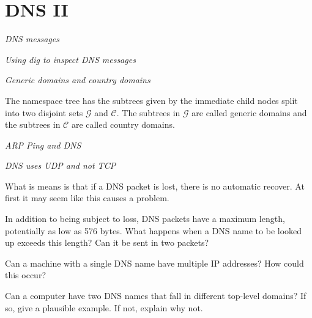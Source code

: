 %
%
%
%
%
%
%
%
%



\section{DNS II}


\frmrule 

\textit{DNS messages}


\frmrule 

\textit{Using dig to inspect DNS messages}


\frmrule 

\textit{Generic domains and country domains}

The namespace tree has the subtrees
given by the immediate child nodes 
split into two disjoint sets $\mathcal{G}$ and $\mathcal{C}$. 
The subtrees in $\mathcal{G}$ are called generic domains 
and the subtrees in $\mathcal{C}$ are called country domains. 


\frmrule 

\textit{ARP Ping and DNS}


\frmrule 

\textit{DNS uses UDP and not TCP}

What is means is that if a DNS packet is lost, there is no automatic recover. 
At first it may seem like this causes a problem. 


\frmrule

In addition to being subject to loss, DNS packets have a maximum length,
potentially as low as 576 bytes. What happens when a DNS name to be looked
up exceeds this length? Can it be sent in two packets?

\frmrule

Can a machine with a single DNS name have multiple IP addresses? How
could this occur?

\frmrule

Can a computer have two DNS names that fall in different top-level domains?
If so, give a plausible example. If not, explain why not.


